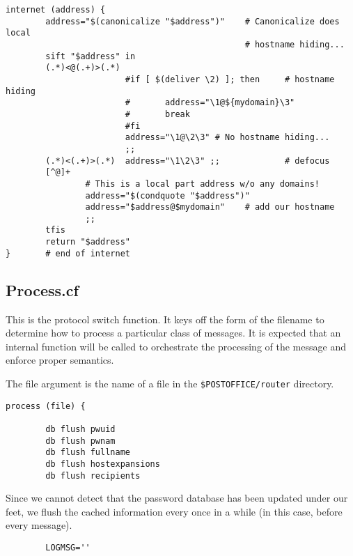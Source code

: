 \begin{tscreen}
\begin{verbatim}
internet (address) {
        address="$(canonicalize "$address")"    # Canonicalize does local
                                                # hostname hiding...
        sift "$address" in
        (.*)<@(.+)>(.*)
                        #if [ $(deliver \2) ]; then     # hostname hiding
                        #       address="\1@${mydomain}\3"
                        #       break
                        #fi
                        address="\1@\2\3" # No hostname hiding...
                        ;;
        (.*)<(.+)>(.*)  address="\1\2\3" ;;             # defocus
        [^@]+           
                # This is a local part address w/o any domains!
                address="$(condquote "$address")"
                address="$address@$mydomain"    # add our hostname
                ;;
        tfis
        return "$address"
}       # end of internet
\end{verbatim}
\end{tscreen}





\subsection{Process.cf}

This is the protocol switch function.  It keys off the form of the filename
to determine how to process a particular class of messages.  It is expected
that an internal function will be called to orchestrate the processing of
the message and enforce proper semantics.

The file argument is the name of a file in the {\tt \$POSTOFFICE/router}
directory.
\begin{tscreen}
\begin{verbatim}
process (file) {

        db flush pwuid
        db flush pwnam
        db flush fullname
        db flush hostexpansions
        db flush recipients
\end{verbatim}
\end{tscreen}

Since we cannot detect that the password database has been updated under
our feet, we flush the cached information every once in a while (in this
case, before every message).
\begin{tscreen}
\begin{verbatim}
        LOGMSG=''
\end{verbatim}
\end{tscreen}

